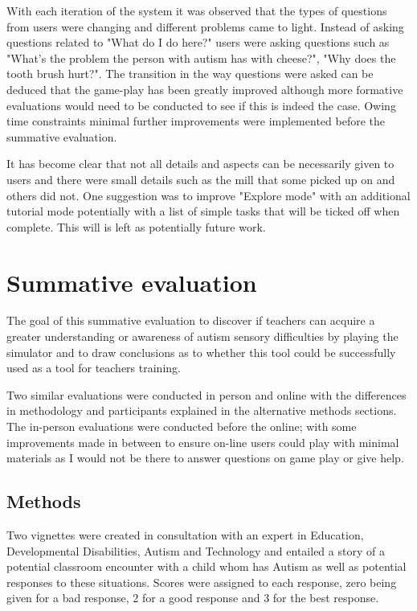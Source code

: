 \documentclass[11pt]{report}
\begin{document}
With each iteration of the system it was observed that the types of questions from users were changing and different problems came to light. Instead of asking questions related to "What do I do here?" users were asking questions such as "What's the problem the person with autism has with cheese?", "Why does the tooth brush hurt?". The transition in the way questions were asked can be deduced that the game-play has been greatly improved although more formative evaluations would need to be conducted to see if this is indeed the case. Owing time constraints minimal further improvements were implemented before the summative evaluation. 

It has become clear that not all details and aspects can be necessarily given to users and there were small details such as the mill that some picked up on and others did not. One suggestion was to improve "Explore mode" with an additional tutorial mode potentially with a list of simple tasks that will be ticked off when complete. This will is left as potentially future work.


\chapter{Summative evaluation}
The goal of this summative evaluation to discover if teachers can acquire a greater understanding or awareness of autism sensory difficulties by playing the simulator and to draw conclusions as to whether this tool could be successfully used as a tool for teachers training. 

Two similar evaluations were conducted in person and online with the differences in methodology and participants explained in the alternative methods sections. The in-person evaluations were conducted before the online; with some improvements made in between to ensure on-line users could play with minimal materials as I would not be there to answer questions on game play or give help. 


\section{Methods}
Two vignettes were created in consultation with an expert in Education, Developmental Disabilities, Autism and Technology and entailed a story of a potential classroom encounter with a child whom has Autism as well as potential responses to these situations. Scores were assigned to each response, zero being given for a bad response, 2 for a good response and 3 for the best response.
\end{document}
